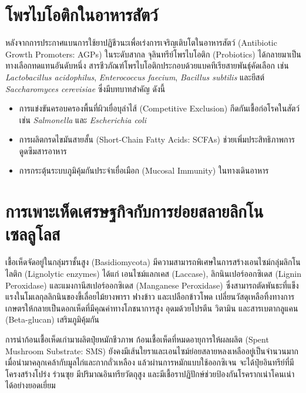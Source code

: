 \section{โพรไบโอติกในอาหารสัตว์}

หลังจากการประกาศแบนการใช้ยาปฏิชีวนะเพื่อเร่งการเจริญเติบโตในอาหารสัตว์ (Antibiotic Growth Promoters: AGPs) ในระดับสากล จุลินทรีย์โพรไบโอติก (Probiotics) ได้กลายมาเป็นทางเลือกทดแทนอันดับหนึ่ง สารชีวภัณฑ์โพรไบโอติกประกอบด้วยแบคทีเรียสายพันธุ์คัดเลือก เช่น \textit{Lactobacillus acidophilus}, \textit{Enterococcus faecium}, \textit{Bacillus subtilis} และยีสต์ \textit{Saccharomyces cerevisiae} ซึ่งมีบทบาทสำคัญ ดังนี้
\begin{itemize}
    \item การแข่งขันครอบครองพื้นที่ผิวเยื่อบุลำไส้ (Competitive Exclusion) กีดกันเชื้อก่อโรคในสัตว์ เช่น \textit{Salmonella} และ \textit{Escherichia coli}
    \item การผลิตกรดไขมันสายสั้น (Short-Chain Fatty Acids: SCFAs) ช่วยเพิ่มประสิทธิภาพการดูดซึมสารอาหาร
    \item การกระตุ้นระบบภูมิคุ้มกันประจำเยื่อเมือก (Mucosal Immunity) ในทางเดินอาหาร
\end{itemize}

\section{การเพาะเห็ดเศรษฐกิจกับการย่อยสลายลิกโนเซลลูโลส}

เชื้อเห็ดจัดอยู่ในกลุ่มราชั้นสูง (Basidiomycota) มีความสามารถพิเศษในการสร้างเอนไซม์กลุ่มลิกโนไลติก (Lignolytic enzymes) ได้แก่ เอนไซม์แลกเคส (Laccase), ลิกนินเปอร์ออกซิเดส (Lignin Peroxidase) และแมงกานีสเปอร์ออกซิเดส (Manganese Peroxidase) ซึ่งสามารถตัดพันธะที่แข็งแรงในโมเลกุลลิกนินของขี้เลื่อยไม้ยางพารา ฟางข้าว และเปลือกข้าวโพด เปลี่ยนวัสดุเหลือทิ้งทางการเกษตรให้กลายเป็นดอกเห็ดที่มีคุณค่าทางโภชนาการสูง อุดมด้วยโปรตีน วิตามิน และสารเบตากลูแคน (Beta-glucan) เสริมภูมิคุ้มกัน

\begin{agribox}{การนำก้อนเชื้อเห็ดเก่ามาผลิตปุ๋ยหมักชีวภาพ}
ก้อนเชื้อเห็ดที่หมดอายุการให้ผลผลิต (Spent Mushroom Substrate: SMS) ยังคงมีเส้นใยราและเอนไซม์ย่อยสลายหลงเหลืออยู่เป็นจำนวนมาก เมื่อนำมาคลุกเคล้ากับมูลไก่และกากถั่วเหลือง แล้วผ่านการหมักแบบใช้ออกซิเจน จะได้ปุ๋ยอินทรีย์ที่มีโครงสร้างโปร่ง ร่วนซุย มีปริมาณอินทรียวัตถุสูง และมีเชื้อราปฏิปักษ์ช่วยป้องกันโรครากเน่าโคนเน่าได้อย่างยอดเยี่ยม
\end{agribox}

